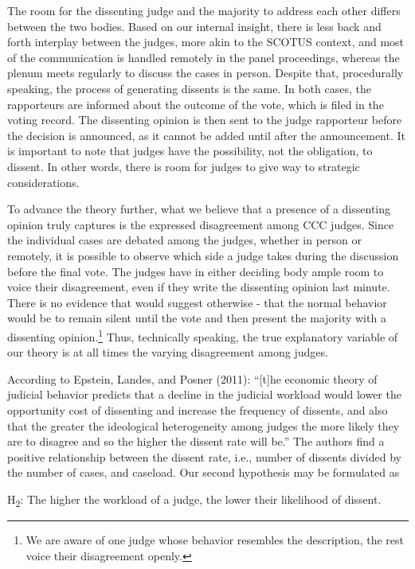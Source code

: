 \documentclass[
  11pt,
]{article}
\begin{document}
The room for the dissenting judge and the majority to address each other
differs between the two bodies. Based on our internal insight, there is
less back and forth interplay between the judges, more akin to the
SCOTUS context, and most of the communication is handled remotely in the
panel proceedings, whereas the plenum meets regularly to discuss the
cases in person. Despite that, procedurally speaking, the process of
generating dissents is the same. In both cases, the rapporteurs are
informed about the outcome of the vote, which is filed in the voting
record. The dissenting opinion is then sent to the judge rapporteur
before the decision is announced, as it cannot be added until after the
announcement. It is important to note that judges have the possibility,
not the obligation, to dissent. In other words, there is room for judges
to give way to strategic considerations.

To advance the theory further, what we believe that a presence of a
dissenting opinion truly captures is the expressed disagreement among
CCC judges. Since the individual cases are debated among the judges,
whether in person or remotely, it is possible to observe which side a
judge takes during the discussion before the final vote. The judges have
in either deciding body ample room to voice their disagreement, even if
they write the dissenting opinion last minute. There is no evidence that
would suggest otherwise - that the normal behavior would be to remain
silent until the vote and then present the majority with a dissenting
opinion.\footnote{We are aware of one judge whose behavior resembles the
  description, the rest voice their disagreement openly.} Thus,
technically speaking, the true explanatory variable of our theory is at
all times the varying disagreement among judges.

According to Epstein, Landes, and Posner (2011): ``{[}t{]}he economic
theory of judicial behavior predicts that a decline in the judicial
workload would lower the opportunity cost of dissenting and increase the
frequency of dissents, and also that the greater the ideological
heterogeneity among judges the more likely they are to disagree and so
the higher the dissent rate will be.'' The authors find a positive
relationship between the dissent rate, i.e., number of dissents divided
by the number of cases, and caseload. Our second hypothesis may be
formulated as

H\textsubscript{2}: The higher the workload of a judge, the lower their
likelihood of dissent.
\end{document}
